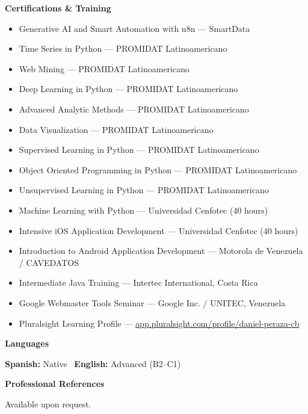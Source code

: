\documentclass[11pt]{article}
\begin{document}
\vspace{12pt}

\begin{center}
    \textbf{Certifications \& Training}
\end{center}
\begin{itemize}[noitemsep, topsep=0pt, partopsep=0pt, parsep=0pt]
    \item Generative AI and Smart Automation with n8n --- SmartData
    \item Time Series in Python --- PROMIDAT Latinoamericano
    \item Web Mining --- PROMIDAT Latinoamericano
    \item Deep Learning in Python --- PROMIDAT Latinoamericano
    \item Advanced Analytic Methods --- PROMIDAT Latinoamericano
    \item Data Visualization --- PROMIDAT Latinoamericano
    \item Supervised Learning in Python --- PROMIDAT Latinoamericano
    \item Object Oriented Programming in Python --- PROMIDAT Latinoamericano
    \item Unsupervised Learning in Python --- PROMIDAT Latinoamericano
    \item Machine Learning with Python --- Universidad Cenfotec (40 hours)
    \item Intensive iOS Application Development --- Universidad Cenfotec (40 hours)
    \item Introduction to Android Application Development --- Motorola de Venezuela / CAVEDATOS
    \item Intermediate Java Training --- Intertec International, Costa Rica
    \item Google Webmaster Tools Seminar --- Google Inc. / UNITEC, Venezuela
    \item Pluralsight Learning Profile --- \href{https://app.pluralsight.com/profile/daniel-peraza-cb}{app.pluralsight.com/profile/daniel-peraza-cb}
\end{itemize}

\vspace{12pt}

\begin{center}
    \textbf{Languages}
\end{center}
\textbf{Spanish:} Native \textbullet\ \textbf{English:} Advanced (B2--C1)

\vspace{12pt}

\begin{center}
    \textbf{Professional References}
\end{center}
Available upon request.
\end{document}
